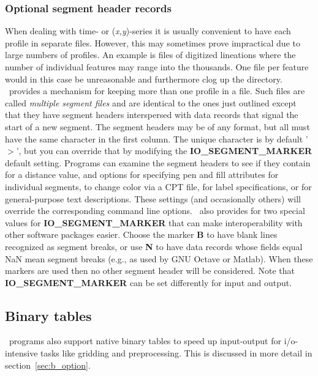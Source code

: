 \subsubsection{Optional segment header records}
When dealing with time- or (\emph{x,y})-series it is usually
convenient to have each profile in separate files.
However, this may sometimes prove impractical due to large numbers
of profiles.  An example is files of digitized lineations where
the number of individual features may range into the thousands.
One file per feature would in this case be unreasonable and
furthermore clog up the directory. \GMT\ provides a mechanism for
keeping more than one profile in a file.  Such files are called
\emph{multiple segment files} and are identical to the ones
just outlined except that they have segment headers interspersed with
data records that signal the start of a new segment.
The segment headers may be of any format, but all must have the same
character in the first column.  The unique character is by default
'$>$', but you can override that by modifying the \textbf{IO\_SEGMENT\_MARKER}
default setting.  Programs can examine the segment headers to see if they
contain  for a distance value,  and  options for specifying pen and
fill attributes for individual segments,  to change
color via a CPT file,  for label specifications, or  for
general-purpose text descriptions.  These settings
(and occasionally others) will override the corresponding command line options.
\GMT\ also provides for two special values for \textbf{IO\_SEGMENT\_MARKER} that can
make interoperability with other software packages easier.  Choose the marker \textbf{B}
to have blank lines recognized as segment breaks, or use \textbf{N} to have data records
whose fields equal NaN mean segment breaks (e.g., as used by GNU Octave or Matlab).
When these markers are used then no other segment header will be considered.  Note that
\textbf{IO\_SEGMENT\_MARKER} can be set differently for input and output.
\subsection{Binary tables}

\GMT\ programs also support native binary tables to speed up
input-output for i/o-intensive tasks like gridding and
preprocessing.  This is discussed in more detail in
section~\ref{sec:b_option}.

